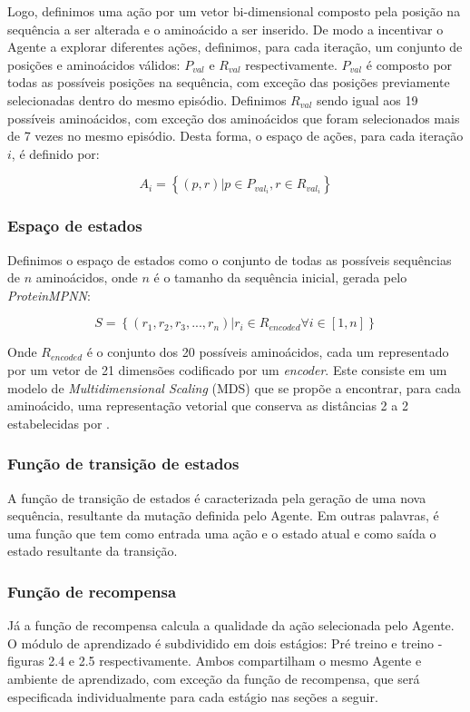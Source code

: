 Logo, definimos uma ação por um vetor bi-dimensional composto pela posição na sequência a ser alterada e o aminoácido a ser inserido. De modo a incentivar o Agente a explorar diferentes ações, definimos, para cada iteração, um conjunto de posições e aminoácidos válidos: $P_{val}$ e $R_{val}$ respectivamente. 
$P_{val}$ é composto por todas as possíveis posições na sequência, com exceção das posições previamente selecionadas dentro do mesmo episódio. 
Definimos $R_{val}$ sendo igual aos 19 possíveis aminoácidos, com exceção dos aminoácidos que foram selecionados mais de 7 vezes no mesmo episódio. Desta forma, o espaço de ações, para cada iteração $i$, é definido por:

\begin{equation}
A_{i} = \left\{(p, r) | p \in P_{val_{i}} , r \in R_{val_{i}} \right\}
\end{equation}
  

\subsubsection{Espaço de estados}
Definimos o espaço de estados como o conjunto de todas as possíveis sequências de $n$ aminoácidos, onde $n$ é o tamanho da sequência inicial, gerada pelo \textit{ProteinMPNN}:

\begin{equation}
S = \left\{(r_{1}, r_{2}, r_{3}, ..., r_{n}) | r_{i} \in R_{encoded} \forall i \in [1,n] \right\}
\end{equation}

Onde $R_{encoded}$ é o conjunto dos 20 possíveis aminoácidos, cada um representado por um vetor de 21 dimensões codificado por um \textit{encoder}. Este consiste em um modelo de \textit{Multidimensional Scaling} (MDS) que se propõe a encontrar, para cada aminoácido, uma representação vetorial que conserva as distâncias 2 a 2 estabelecidas por \cite{aminodist}.

\subsubsection{Função de transição de estados}
A função de transição de estados é caracterizada pela geração de uma nova sequência, resultante da mutação definida pelo Agente. Em outras palavras, é uma função que tem como entrada uma ação e o estado atual e como saída o estado resultante da transição. 

\subsubsection{Função de recompensa}
Já a função de recompensa calcula a qualidade da ação selecionada pelo Agente. O módulo de aprendizado é subdividido em dois estágios: Pré treino e treino - figuras 2.4 e 2.5 respectivamente. Ambos compartilham o mesmo Agente e ambiente de aprendizado, com exceção da função de recompensa, que será especificada individualmente para cada estágio nas seções a seguir.

